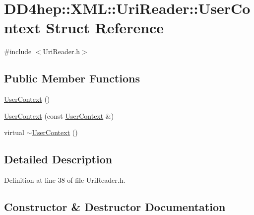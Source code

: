 \hypertarget{struct_d_d4hep_1_1_x_m_l_1_1_uri_reader_1_1_user_context}{}\section{D\+D4hep\+:\+:X\+ML\+:\+:Uri\+Reader\+:\+:User\+Context Struct Reference}
\label{struct_d_d4hep_1_1_x_m_l_1_1_uri_reader_1_1_user_context}


{\ttfamily \#include $<$Uri\+Reader.\+h$>$}

\subsection*{Public Member Functions}
\begin{DoxyCompactItemize}
\item 
\hyperlink{struct_d_d4hep_1_1_x_m_l_1_1_uri_reader_1_1_user_context_a1bb2229dead738dc31cb6cccccbeaa4d}{User\+Context} ()
\item 
\hyperlink{struct_d_d4hep_1_1_x_m_l_1_1_uri_reader_1_1_user_context_a3597e8269b9454ec60a49b9611a5b002}{User\+Context} (const \hyperlink{struct_d_d4hep_1_1_x_m_l_1_1_uri_reader_1_1_user_context}{User\+Context} \&)
\item 
virtual \hyperlink{struct_d_d4hep_1_1_x_m_l_1_1_uri_reader_1_1_user_context_afabe7889ca4e26019a3108850361287e}{$\sim$\+User\+Context} ()
\end{DoxyCompactItemize}


\subsection{Detailed Description}


Definition at line 38 of file Uri\+Reader.\+h.



\subsection{Constructor \& Destructor Documentation}
\hypertarget{struct_d_d4hep_1_1_x_m_l_1_1_uri_reader_1_1_user_context_a1bb2229dead738dc31cb6cccccbeaa4d}{}\label{struct_d_d4hep_1_1_x_m_l_1_1_uri_reader_1_1_user_context_a1bb2229dead738dc31cb6cccccbeaa4d} 
